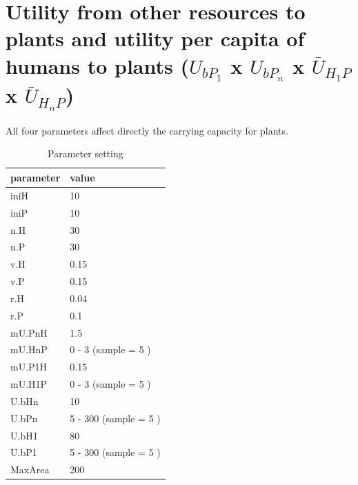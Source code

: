 \documentclass[]{book}
\begin{document}
\newpage

\hypertarget{utility-from-other-resources-to-plants-and-utility-per-capita-of-humans-to-plants-u_bp_1-x-u_bp_n-x-baru_h_1p-x-baru_h_np}{%
\section{\texorpdfstring{Utility from other resources to plants and utility per capita of humans to plants (\(U_{bP_{1}}\) x \(U_{bP_{n}}\) x \(\bar{U}_{H_{1}P}\) x \(\bar{U}_{H_{n}P}\))}{Utility from other resources to plants and utility per capita of humans to plants (U\_\{bP\_\{1\}\} x U\_\{bP\_\{n\}\} x \textbackslash{}bar\{U\}\_\{H\_\{1\}P\} x \textbackslash{}bar\{U\}\_\{H\_\{n\}P\})}}\label{utility-from-other-resources-to-plants-and-utility-per-capita-of-humans-to-plants-u_bp_1-x-u_bp_n-x-baru_h_1p-x-baru_h_np}}


All four parameters affect directly the carrying capacity for plants.

\begin{table}[!h]

\caption{\label{tab:4UbPUHPtablepdf}Parameter setting}
\centering
\begin{tabular}{l|l}
\hline
parameter & value\\
\hline
iniH & 10\\
\hline
iniP & 10\\
\hline
n.H & 30\\
\hline
n.P & 30\\
\hline
v.H & 0.15\\
\hline
v.P & 0.15\\
\hline
r.H & 0.04\\
\hline
r.P & 0.1\\
\hline
mU.PnH & 1.5\\
\hline
mU.HnP & 0 - 3 (sample = 5 )\\
\hline
mU.P1H & 0.15\\
\hline
mU.H1P & 0 - 3 (sample = 5 )\\
\hline
U.bHn & 10\\
\hline
U.bPn & 5 - 300 (sample = 5 )\\
\hline
U.bH1 & 80\\
\hline
U.bP1 & 5 - 300 (sample = 5 )\\
\hline
MaxArea & 200\\
\hline
\end{tabular}
\end{table}
\end{document}

